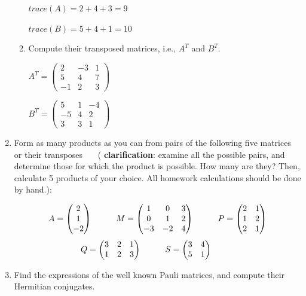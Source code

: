 \documentclass[fleqn]{article}
\begin{document}
\begin{enumerate}
\begin{enumerate}
  $
  trace(A)=2+4+3=9
  $
  
  $
  trace(B)=5+4+1=10
  $
  
  \item  Compute their transposed matrices, i.e., $A^T$ and $B^T$. 
  
  \noindent
  $A^T=
  \begin{pmatrix}
    2 & -3 & 1 \\
    5 & 4 & 7 \\
    -1 & 2 & 3
  \end{pmatrix}
  $
  
  \noindent
  $B^T=
  \begin{pmatrix}
    5 & 1 & -4 \\
    -5 & 4 & 2 \\
    3 & 3 & 1
  \end{pmatrix}
  $
  
  \end{enumerate}
  
  \item Form as many products as you can from pairs of the following five matrices or their transposes ~~~( {\bf clarification}: examine all the possible pairs, and determine those for which the product is possible. How many are they?  Then, calculate 5 products of your choice. All homework calculations should be done by hand.): 
  
  
  $$A=\begin{pmatrix}
    2  \\
    1  \\
    -2 
    \end{pmatrix} \hskip 1truecm M=\begin{pmatrix}
    1 & 0 & 3 \\
    0 & 1 & 2 \\
    -3 & -2 & 4
    \end{pmatrix}\hskip 1truecm P=\begin{pmatrix}
      2 & 1  \\
      1 & 2  \\
      2 & 1 
      \end{pmatrix}
    $$ 
    $$Q=\begin{pmatrix}
      3 & 2 & 1 \\
      1 & 2 & 3 \\
      \end{pmatrix} \hskip 1truecm S=\begin{pmatrix}
      3 & 4 \\
      5 & 1 \\
      \end{pmatrix}\hskip 1truecm
    $$ 
  
  
  
  \item Find the expressions of the well known Pauli matrices, and compute their Hermitian conjugates. 
  
  \end{enumerate}
\end{document}
